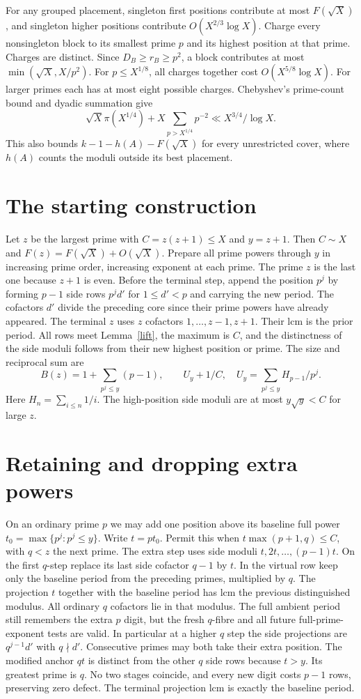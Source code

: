 \documentclass[11pt]{article}
\begin{document}
For any grouped placement, singleton first positions contribute at most $F(\sqrt X)$, and singleton higher positions contribute $O(X^{2/3}\log X)$. Charge every nonsingleton block to its smallest prime $p$ and its highest position at that prime. Charges are distinct. Since $D_B\ge r_B\ge p^2$, a block contributes at most $\min(\sqrt X,X/p^2)$. For $p\le X^{1/8}$, all charges together cost $O(X^{5/8}\log X)$. For larger primes each has at most eight possible charges. Chebyshev's prime-count bound and dyadic summation give
\[
 \sqrt X\pi(X^{1/4})+X\sum_{p>X^{1/4}}p^{-2}\ll X^{3/4}/\log X .
\]
This also bounds $k-1-h(A)-F(\sqrt X)$ for every unrestricted cover, where $h(A)$ counts the moduli outside its best placement.

\section{The starting construction}
Let $z$ be the largest prime with $C=z(z+1)\le X$ and $y=z+1$. Then $C\sim X$ and $F(z)=F(\sqrt X)+O(\sqrt X)$. Prepare all prime powers through $y$ in increasing prime order, increasing exponent at each prime. The prime $z$ is the last one because $z+1$ is even. Before the terminal step, append the position $p^j$ by forming $p-1$ side rows $p^j d'$ for $1\le d'<p$ and carrying the new period. The cofactors $d'$ divide the preceding core since their prime powers have already appeared. The terminal $z$ uses $z$ cofactors $1,\ldots,z-1,z+1$. Their lcm is the prior period. All rows meet Lemma~\ref{lift}, the maximum is $C$, and the distinctness of the side moduli follows from their new highest position or prime. The size and reciprocal sum are
\[
 B(z)=1+\sum_{p^j\le y}(p-1),\qquad
 U_y+1/C,\quad U_y=\sum_{p^j\le y}H_{p-1}/p^j.
\]
Here $H_n=\sum_{i\le n}1/i$. The high-position side moduli are at most $y\sqrt y<C$ for large $z$.

\section{Retaining and dropping extra powers}
On an ordinary prime $p$ we may add one position above its baseline full power $t_0=\max\{p^j:p^j\le y\}$. Write $t=p t_0$. Permit this when $t\max(p+1,q)\le C$, with $q<z$ the next prime. The extra step uses side moduli $t,2t,\ldots,(p-1)t$. On the first $q$-step replace its last side cofactor $q-1$ by $t$. In the virtual row keep only the baseline period from the preceding primes, multiplied by $q$. The projection $t$ together with the baseline period has lcm the previous distinguished modulus. All ordinary $q$ cofactors lie in that modulus. The full ambient period still remembers the extra $p$ digit, but the fresh $q$-fibre and all future full-prime-exponent tests are valid. In particular at a higher $q$ step the side projections are $q^{j-1}d'$ with $q\nmid d'$. Consecutive primes may both take their extra position. The modified anchor $qt$ is distinct from the other $q$ side rows because $t>y$. Its greatest prime is $q$. No two stages coincide, and every new digit costs $p-1$ rows, preserving zero defect. The terminal projection lcm is exactly the baseline period.
\end{document}
